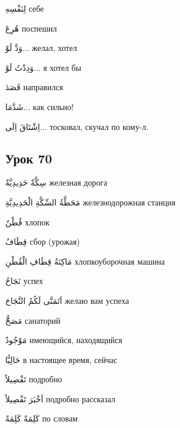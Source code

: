 \documentclass[a5paper]{article}
\newcommand\textstyleDropCaps[1]{#1}
\newcommand\textstyleCaptioncharacters[1]{#1}
\begin{document}
\textstyleCaptioncharacters{لِنَفْسِهِ }\textstyleDropCaps{себе‎}

\textstyleCaptioncharacters{هُرِعَ }\textstyleDropCaps{поспешил‎}

\textstyleCaptioncharacters{وَدَّ لَوْ...ِ }\textstyleDropCaps{желал, хотел‎}

\textstyleCaptioncharacters{وَدِدْتُ لَوْ... }\textstyleDropCaps{я хотел бы‎}

\textstyleCaptioncharacters{قَصَدَ }\textstyleDropCaps{направился‎}

\textstyleCaptioncharacters{شَدَّمَا... }\textstyleDropCaps{как сильно!‎}

\textstyleCaptioncharacters{اِشْتَاقَ اِلَى... }\textstyleDropCaps{тосковал, скучал по кому-л.‎}

\subsection[Урок 70‎]{\textstyleDropCaps{Урок 70‎}}
\textstyleCaptioncharacters{سِكَّةٌ حَدِيدِيَّةٌ }\textstyleDropCaps{же­лезная дорога‎}

\textstyleCaptioncharacters{مَحَطَّةُ السِّكَّةِ الْحَدِيدِيَّةِ }\textstyleDropCaps{железнодорожная станция‎}

\textstyleCaptioncharacters{قُطْنٌ }\textstyleDropCaps{хлопок‎}

\textstyleCaptioncharacters{قِطَافٌ }\textstyleDropCaps{сбор (урожая)‎}

\textstyleCaptioncharacters{مَاكِنَةُ قِطَافِ الْقُطْنِ }\textstyleDropCaps{хлопкоуборочная машина‎}

\textstyleCaptioncharacters{نَجَاحٌ }\textstyleDropCaps{успех‎}

\textstyleCaptioncharacters{اَتَمَنَّى لَكُمُ النَّجَاحَ }\textstyleDropCaps{же­лаю вам успеха‎}

\textstyleCaptioncharacters{مَصَحٌّّ }\textstyleDropCaps{санаторий‎}

\textstyleCaptioncharacters{مَوْجُودٌ }\textstyleDropCaps{имеющийся, наход­ящийся‎}

\textstyleCaptioncharacters{حَالِيًّا }\textstyleDropCaps{в настоящее время, сейчас‎}

\textstyleCaptioncharacters{تَفْصِيلاً }\textstyleDropCaps{подробно‎}

\textstyleCaptioncharacters{اَخْبَرَ تَفْصِيلاً }\textstyleDropCaps{подробно рассказал‎}

\textstyleCaptioncharacters{كَلِمَةً كَلِمَةً }\textstyleDropCaps{по словам‎}
\end{document}
